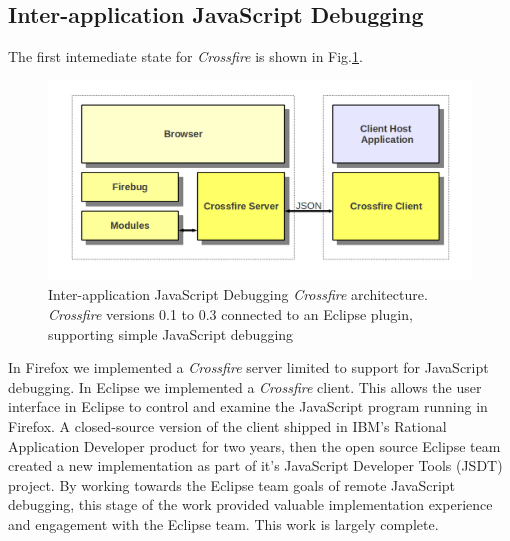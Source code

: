 \subsection{Inter-application JavaScript Debugging}
The first intemediate state for \textit{Crossfire} is shown in Fig.\ref{fig:fireclipse}.
\begin{figure}[htp]
  \includegraphics  [width = 86 mm] {figures/fireclipse.png}
  \caption{Inter-application JavaScript Debugging \textit{Crossfire} architecture.
\textit{Crossfire} versions 0.1 to 0.3 connected to an Eclipse plugin, supporting simple JavaScript debugging}
 \label{fig:fireclipse}
\end{figure}
In Firefox we implemented a \textit{Crossfire} server limited to support for JavaScript debugging.
In Eclipse we implemented a \textit{Crossfire} client. This allows the user interface in Eclipse to control
 and examine the JavaScript program running
in Firefox.  A closed-source version of the client shipped in IBM's Rational Application Developer product for two years,
then the open source Eclipse team created a new implementation as part of it's JavaScript Developer
Tools (JSDT) project\cite{JSDT}.  By working towards the Eclipse team goals of remote JavaScript debugging,
this stage of the work provided valuable implementation experience and engagement with the Eclipse team.
This work is largely complete.

